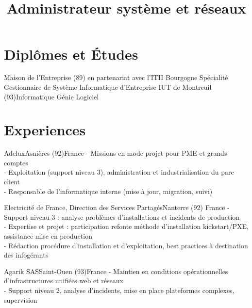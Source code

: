 \documentclass[10pt,a4paper]{moderncv}
\title{Administrateur système et réseaux}
\begin{document}
\maketitle

\section{Diplômes et Études}
{Maison de l'Entreprise (89) en partenariat avec l'ITII Bourgogne}{}{}
{Spécialité Gestionnaire de Système Informatique d'Entreprise}
{IUT de Montreuil (93)}{}{}{Informatique Génie Logiciel}


\section{Experiences}
{Adelux}{Asnières (92)}{France}
{
- Missions en mode projet pour PME et grands comptes\\
- Exploitation (support niveau 3), administration et industrialisation du parc
client\\
- Responsable de l'informatique interne (mise à jour, migration, suivi)
\newline{}
}

{Electricité de France, Direction des Services Partagés}{Nanterre (92)}
{France}
{
- Support niveau 3 : analyse problèmes d'installations et incidents de production\\
- Expertise et projet : participation refonte méthode d'installation kickstart/PXE,
assistance mise en production\\
- Rédaction procédure d'installation et d'exploitation, best practices à
destination des infogérants
\newline{}
}

{Agarik SAS}{Saint-Ouen (93)}{France}
{
- Maintien en conditions opérationnelles d'infrastructures unifiées web et
réseaux\\
- Support niveau 2, analyse d'incidents, mise en place plateformes
complexes, supervision
\newline{}}
\end{document}
